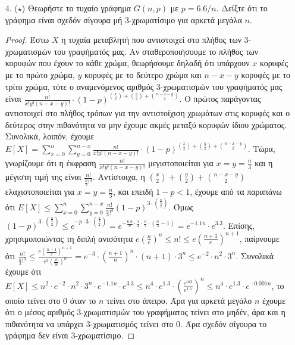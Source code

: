 \documentclass[a4paper, oneside, 11pt]{article}
\theoremstyle{definition}
\begin{document}
\begin{enumerate}
   \begin{itemize}
      \item Για $k = 1, \ldots, n$ ποιά η πιθανότητα $r(v) = k$. Η πιθανότητα θα
            έχει μορφή γινομένου.
      \item Δείξτε ότι για μία κορυφή $v$, $Pr[ r(v) \leq \sqrt{n} / 10 ]
            \leq 1/3$ και $Pr [ r(v) \geq 10\sqrt{n} ] \leq 1/3$.
   \end{itemize}

   \begin{proof}
   \end{proof}

\item[4. ($\star$)]
   Θεωρήστε το τυχαίο γράφημα $G(n, p)$ με $p = 6.6/n$. Δείξτε ότι το γράφημα
   είναι σχεδόν σίγουρα μή 3-χρωματίσιμο για αρκετά μεγάλα $n$.

   \begin{proof}
Έστω $X$ η τυχαία μεταβλητή που αντιστοιχεί στο πλήθος των 3-χρωματισμών του γραφήματός μας. Αν σταθεροποιήσουμε το πλήθος των κορυφών που έχουν το κάθε χρώμα, θεωρήσουμε δηλαδή ότι υπάρχουν $x$ κορυφές
με το πρώτο χρώμα, $y$ κορυφές με το δεύτερο χρώμα και $n-x-y$ κορυφές με το τρίτο χρώμα, τότε ο αναμενόμενος αριθμός 3-χρωματισμών του γραφήματός μας είναι $\frac{n!}{x!y!(n-x-y)!} \cdot 
(1-p)^{{x \choose 2} + {y\choose 2} + {n-x-y\choose 2}}$. Ο πρώτος παράγοντας αντιστοιχεί στο πλήθος τρόπων για την αντιστοίχιση χρωμάτων στις κορυφές και ο δεύτερος στην πιθανότητα να μην έχουμε ακμές
μεταξύ κορυφών ίδιου χρώματος. Συνολικά, λοιπόν, έχουμε $E[X] = \sum_{x=0}^{n} \sum_{y=0}^{n-x} \frac{n!}{x!y!(n-x-y)!}\cdot (1-p)^{{x\choose 2}+{y\choose 2}+{n-x-y\choose 2}}$.
Τώρα, γνωρίζουμε ότι η έκφραση $\frac{n!}{x!y!(n-x-y)!}$ μεγιστοποιείται για $x=y=\frac{n}{3}$ και η μέγιστη τιμή της είναι $\frac{n!}{\frac{n}{3}!^3}$. Αντίστοιχα, η ${{x \choose 2} + {y\choose 2} + {n-x-y\choose 2}}$ 
ελαχιστοποιείται για $x=y=\frac{n}{3}$, και επειδή $1-p<1$, έχουμε από τα παραπάνω ότι $E[X] \leq \sum_{x=0}^{n}\sum_{y=0}^{n-x} \frac{n!}{\frac{n}{3}!^3} (1-p)^{3\cdot {\frac{n}{3}\choose 2}}$.
Όμως $(1-p)^{3\cdot {\frac{n}{3}\choose 2}}\leq e^{-p\cdot {3\cdot {\frac{n}{3}\choose 2}}}=e^{-\frac{6.6}{n}\cdot {\frac{3}{2}\cdot \frac{n}{3}\cdot (\frac{n}{3}-1)}}=e^{-1.1n}\cdot e^{3.3}$.
Επίσης, χρησιμοποιώντας τη διπλή ανισότητα $e(\frac{n}{e})^n \leq n! \leq e(\frac{n+1}{e})^{n+1}$, παίρνουμε ότι $\frac{n!}{\frac{n}{3}!^3}\leq \frac{e(\frac{n+1}{e})^{n+1}}{e^3 (\frac{n}{3e})^n
}=e^{-3} \cdot (\frac{n+1}{n})^n \cdot (n+1) \cdot 3^{n} \leq e^{-2} \cdot n^2 \cdot 3^{n}$. Συνολικά έχουμε ότι $E[X] \leq n^2 \cdot e^{-2} \cdot n^2 \cdot 3^{n}\cdot e^{-1.1n}\cdot e^{3.3}\leq 
n^4 \cdot e^{1.3}\cdot (\frac{e^{ln3}}{e^{1.1}})^n \leq n^4\cdot e^{1.3}\cdot e^{-0.001n}$, το οποίο τείνει στο 0 όταν το $n$ τείνει στο άπειρο. Άρα για αρκετά μεγάλο $n$ έχουμε ότι ο μέσος αριθμός
3-χρωματισμών του γραφήματος τείνει στο μηδέν, άρα και η πιθανότητα να υπάρχει 3-χρωματισμός τείνει στο 0. Άρα σχεδόν σίγουρα το γράφημα δεν είναι 3-χρωματίσιμο.
   \end{proof}


\end{enumerate}
\end{document}
